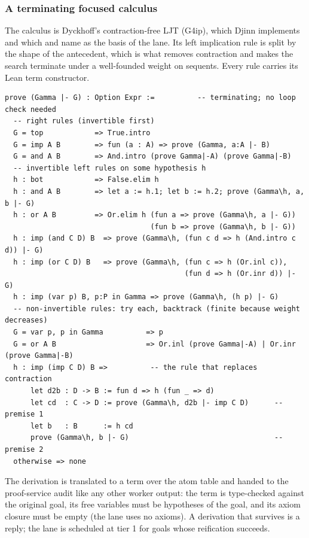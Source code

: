 \subsubsection{A terminating focused calculus}

The calculus is Dyckhoff's contraction-free LJT (G4ip), which Djinn implements and which  and  name as the basis of the lane. Its left implication rule is split by the shape of the antecedent, which is what removes contraction and makes the search terminate under a well-founded weight on sequents. Every rule carries its Lean term constructor.
\begin{lstlisting}
prove (Gamma |- G) : Option Expr :=          -- terminating; no loop check needed
  -- right rules (invertible first)
  G = top            => True.intro
  G = imp A B        => fun (a : A) => prove (Gamma, a:A |- B)
  G = and A B        => And.intro (prove Gamma|-A) (prove Gamma|-B)
  -- invertible left rules on some hypothesis h
  h : bot            => False.elim h
  h : and A B        => let a := h.1; let b := h.2; prove (Gamma\h, a, b |- G)
  h : or A B         => Or.elim h (fun a => prove (Gamma\h, a |- G))
                                  (fun b => prove (Gamma\h, b |- G))
  h : imp (and C D) B  => prove (Gamma\h, (fun c d => h (And.intro c d)) |- G)
  h : imp (or C D) B   => prove (Gamma\h, (fun c => h (Or.inl c)),
                                          (fun d => h (Or.inr d)) |- G)
  h : imp (var p) B, p:P in Gamma => prove (Gamma\h, (h p) |- G)
  -- non-invertible rules: try each, backtrack (finite because weight decreases)
  G = var p, p in Gamma          => p
  G = or A B                     => Or.inl (prove Gamma|-A) | Or.inr (prove Gamma|-B)
  h : imp (imp C D) B =>          -- the rule that replaces contraction
      let d2b : D -> B := fun d => h (fun _ => d)
      let cd  : C -> D := prove (Gamma\h, d2b |- imp C D)      -- premise 1
      let b   : B      := h cd
      prove (Gamma\h, b |- G)                                  -- premise 2
  otherwise => none
\end{lstlisting}

The derivation is translated to a term over the atom table and handed to the proof-service audit like any other worker output: the term is type-checked against the original goal, its free variables must be hypotheses of the goal, and its axiom closure must be empty (the lane uses no axioms). A derivation that survives is a  reply; the lane is scheduled at tier 1 for goals whose reification succeeds.

